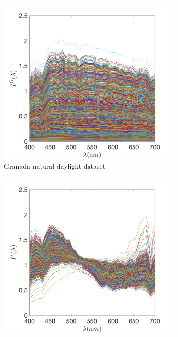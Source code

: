 \documentclass{jov}
\begin{document}
\begin{figure}
\centering
	\begin{subfigure}[b]{0.3 \textwidth}
    \centering
        \includegraphics[width=\textwidth]{../Figures/Figure12/Figure12_a.pdf}
        \caption{Granada natural daylight dataset}
        \label{fig:granadaSpectra}
    \end{subfigure}
    \begin{subfigure}[b]{0.3\textwidth}
    \centering
        \includegraphics[width=\textwidth]{../Figures/Figure12/Figure12_b.pdf}

\end{subfigure}
\end{figure}
\end{document}
